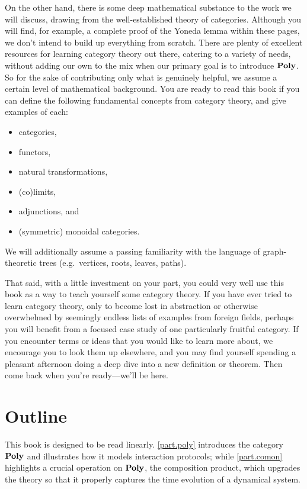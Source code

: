 \documentclass[Book-Poly]{subfiles}
\begin{document}
On the other hand, there is some deep mathematical substance to the work we will discuss, drawing from the well-established theory of categories.
Although you will find, for example, a complete proof of the Yoneda lemma within these pages, we don't intend to build up everything from scratch.
There are plenty of excellent resources for learning category theory out there, catering to a variety of needs, without adding our own to the mix when our primary goal is to introduce $\mathbf{Poly}$.
So for the sake of contributing only what is genuinely helpful, we assume a certain level of mathematical background.
You are ready to read this book if you can define the following fundamental concepts from category theory, and give examples of each:
\begin{itemize}
    \item categories,
    \item functors,
    \item natural transformations,
    \item (co)limits,
    \item adjunctions, and
    \item (symmetric) monoidal categories.
\end{itemize}
We will additionally assume a passing familiarity with the language of graph-theoretic trees (e.g.\ vertices, roots, leaves, paths).

That said, with a little investment on your part, you could very well use this book as a way to teach yourself some category theory.
If you have ever tried to learn category theory, only to become lost in abstraction or otherwise overwhelmed by seemingly endless lists of examples from foreign fields, perhaps you will benefit from a focused case study of one particularly fruitful category.
If you encounter terms or ideas that you would like to learn more about, we encourage you to look them up elsewhere, and you may find yourself spending a pleasant afternoon doing a deep dive into a new definition or theorem.
Then come back when you're ready---we'll be here.

\section*{Outline}

This book is designed to be read linearly.
\cref{part.poly} introduces the category $\mathbf{Poly}$ and illustrates how it models interaction protocols; while \cref{part.comon} highlights a crucial operation on $\mathbf{Poly}$, the composition product, which upgrades the theory so that it properly captures the time evolution of a dynamical system.
\end{document}
